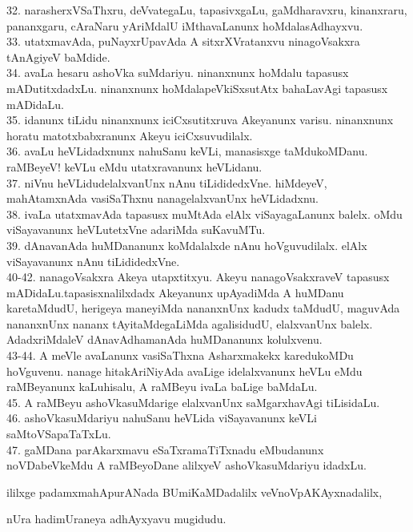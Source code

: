 \documentclass{article}
\begin{document}
32. narasherxVSaThxru, deVvategaLu, tapasivxgaLu, gaMdharavxru, kinanxraru, pananxgaru, cAraNaru yAriMdalU iMthavaLanunx hoMdalasAdhayxvu.\\
33. utatxmavAda, puNayxrUpavAda A sitxrXVratanxvu ninagoVsakxra tAnAgiyeV baMdide.\\
34. avaLa hesaru ashoVka suMdariyu. ninanxnunx hoMdalu tapasusx mADutitxdadxLu. ninanxnunx hoMdalapeVkiSxsutAtx bahaLavAgi tapasusx mADidaLu.\\
35. idanunx tiLidu ninanxnunx iciCxsutitxruva Akeyanunx varisu. ninanxnunx horatu matotxbabxranunx Akeyu iciCxsuvudilalx.\\
36. avaLu heVLidadxnunx nahuSanu keVLi, manasisxge taMdukoMDanu. raMBeyeV! keVLu eMdu utatxravanunx heVLidanu.\\
37. niVnu heVLidudelalxvanUnx nAnu tiLididedxVne. hiMdeyeV, mahAtamxnAda vasiSaThxnu nanagelalxvanUnx heVLidadxnu.\\
38. ivaLa utatxmavAda tapasusx muMtAda elAlx viSayagaLanunx balelx. oMdu viSayavanunx heVLutetxVne adariMda suKavuMTu.\\
39. dAnavanAda huMDananunx koMdalalxde nAnu hoVguvudilalx. elAlx viSayavanunx nAnu tiLididedxVne.\\
40-42. nanagoVsakxra Akeya utapxtitxyu. Akeyu nanagoVsakxraveV tapasusx mADidaLu.tapasisxnalilxdadx Akeyanunx upAyadiMda A huMDanu karetaMdudU, herigeya maneyiMda nananxnUnx kadudx taMdudU, maguvAda nananxnUnx nananx tAyitaMdegaLiMda agalisidudU, elalxvanUnx balelx. AdadxriMdaleV dAnavAdhamanAda huMDananunx kolulxvenu.\\
43-44. A meVle avaLanunx vasiSaThxna Asharxmakekx karedukoMDu hoVguvenu. nanage hitakAriNiyAda avaLige idelalxvanunx heVLu eMdu raMBeyanunx kaLuhisalu, A raMBeyu ivaLa baLige baMdaLu.\\
45. A  raMBeyu ashoVkasuMdarige elalxvanUnx saMgarxhavAgi tiLisidaLu.\\
46. ashoVkasuMdariyu nahuSanu heVLida viSayavanunx keVLi saMtoVSapaTaTxLu.\\
47. gaMDana parAkarxmavu eSaTxramaTiTxnadu eMbudanunx noVDabeVkeMdu A raMBeyoDane alilxyeV ashoVkasuMdariyu idadxLu.\\

\begin{center}
ililxge padamxmahApurANada BUmiKaMDadalilx veVnoVpAKAyxnadalilx,
\end{center}

\begin{center}
nUra hadimUraneya adhAyxyavu mugidudu.
\end{center}
\end{document}

